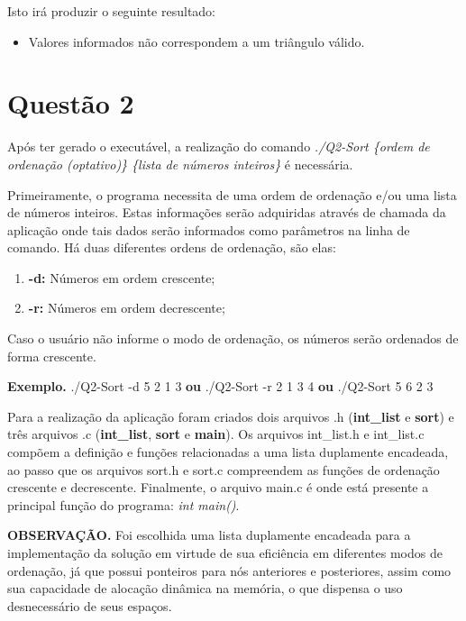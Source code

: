   Isto irá produzir o seguinte resultado:

  \begin{itemize}
    \item Valores informados não correspondem a um triângulo válido.
  \end{itemize}

\section{Questão 2}

  Após ter gerado o executável, a realização do comando \textit{./Q2-Sort \{ordem de ordenação (optativo)\} \{lista de números
  inteiros\}} é necessária.

  Primeiramente, o programa necessita de uma ordem de ordenação e/ou uma lista de números inteiros. Estas informações
  serão adquiridas através de chamada da aplicação onde tais dados serão informados como parâmetros na linha de comando.
  Há duas diferentes ordens de ordenação, são elas:

  \begin{enumerate}
    \item \textbf{-d:} Números em ordem crescente;
    \item \textbf{-r:} Números em ordem decrescente;
  \end{enumerate}

  Caso o usuário não informe o modo de ordenação, os números serão ordenados de forma crescente.

  \textbf{Exemplo.} ./Q2-Sort -d 5 2 1 3 \textbf{ou} ./Q2-Sort -r 2 1 3 4 \textbf{ou} ./Q2-Sort 5 6 2 3

  Para a realização da aplicação foram criados dois arquivos .h (\textbf{int\_list} e \textbf{sort}) e três arquivos .c
  (\textbf{int\_list}, \textbf{sort} e \textbf{main}). Os arquivos int\_list.h e int\_list.c compõem a definição e
  funções relacionadas a uma lista duplamente encadeada, ao passo que os arquivos sort.h e sort.c compreendem as funções
  de ordenação crescente e decrescente. Finalmente, o arquivo main.c é onde está presente a principal função do
  programa: \textit{int main()}.

  \textbf{OBSERVAÇÃO.} Foi escolhida uma lista duplamente encadeada para a implementação da solução em virtude de sua
  eficiência em diferentes modos de ordenação, já que possui ponteiros para nós anteriores e posteriores, assim como sua
  capacidade de alocação dinâmica na memória, o que dispensa o uso desnecessário de seus espaços.

